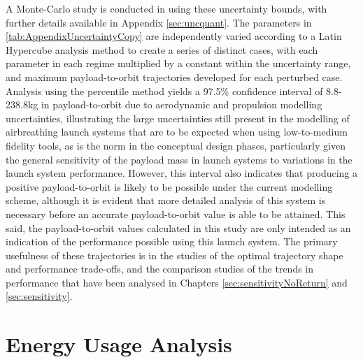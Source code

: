 A Monte-Carlo study is conducted in using these uncertainty bounds, with further details available in Appendix \ref{sec:uncquant}. The parameters in \ref{tab:AppendixUncertaintyCopy} are independently varied according to a Latin Hypercube analysis method to create a series of distinct cases, with each parameter in each regime multiplied by a constant within the uncertainty range, and maximum payload-to-orbit trajectories developed for each perturbed case. 
Analysis using the percentile method yields a 97.5\% confidence interval of 8.8-238.8kg in payload-to-orbit due to aerodynamic and propulsion modelling uncertainties, illustrating the large uncertainties still present in the modelling of airbreathing launch systems that are to be expected when using low-to-medium fidelity tools, as is the norm in the conceptual design phases, particularly given the general sensitivity of the payload mass in launch systems to variations in the launch system performance. However, this interval also indicates that producing a positive payload-to-orbit is likely to be possible under the current modelling scheme, although it is evident that more detailed analysis of this system is necessary before an accurate payload-to-orbit value is able to be attained. This said, the payload-to-orbit values calculated in this study are only intended as an indication of the performance possible using this launch system. The primary usefulness of these trajectories is in the studies of the optimal trajectory shape and performance trade-offs, and the comparison studies of the trends in performance that have been analysed in Chapters \ref{sec:sensitivityNoReturn} and \ref{sec:sensitivity}. 

\section{Energy Usage Analysis}\label{sec:exergy1}




